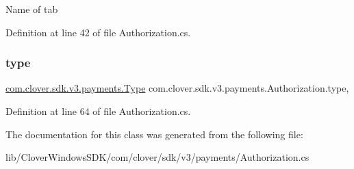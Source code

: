 Name of tab 



Definition at line 42 of file Authorization.\+cs.

\mbox{\label{classcom_1_1clover_1_1sdk_1_1v3_1_1payments_1_1_authorization_aa8da508a44373fdaa52d69aba35bbd29}} 
\subsubsection{\texorpdfstring{type}{type}}
{\footnotesize\ttfamily \hyperlink{namespacecom_1_1clover_1_1sdk_1_1v3_1_1payments_ab3a3c9595b671a87b6fe5f1920784b73}{com.\+clover.\+sdk.\+v3.\+payments.\+Type} com.\+clover.\+sdk.\+v3.\+payments.\+Authorization.\+type\hspace{0.3cm}{\ttfamily [get]}, {\ttfamily [set]}}



Definition at line 64 of file Authorization.\+cs.



The documentation for this class was generated from the following file\+:\begin{DoxyCompactItemize}
\item 
lib/\+Clover\+Windows\+S\+D\+K/com/clover/sdk/v3/payments/Authorization.\+cs\end{DoxyCompactItemize}
